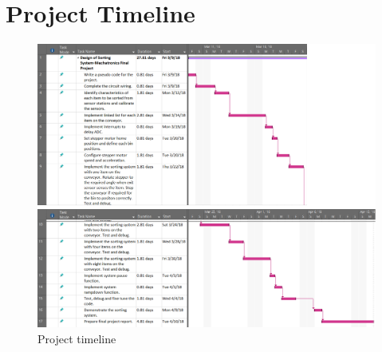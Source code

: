 \newpage
\section{Project Timeline}\label{sec:timeline}
\begin{figure}[tbph]
	\centering
	\includegraphics[width=1\linewidth]{"images/timeline"}
	\caption{Project timeline}
	\label{fig:ABCD}
\end{figure}
